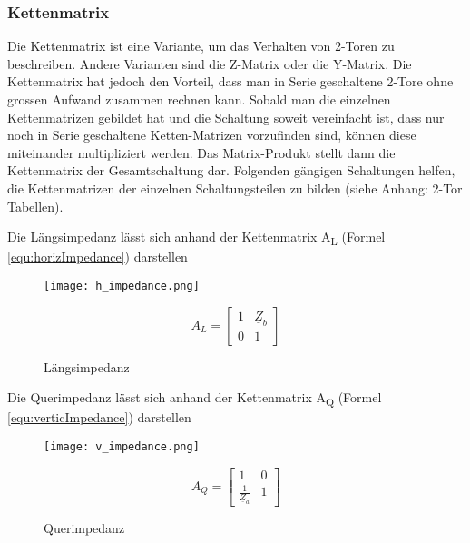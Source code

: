 \subsubsection{Kettenmatrix}\label{subsubsec:kettenmatrix}

Die Kettenmatrix ist eine Variante, um das Verhalten von 2-Toren zu beschreiben. Andere Varianten sind die Z-Matrix oder die Y-Matrix. Die Kettenmatrix hat jedoch den Vorteil, dass man in Serie geschaltene 2-Tore ohne grossen Aufwand zusammen rechnen kann. Sobald man die einzelnen Kettenmatrizen gebildet hat und die Schaltung soweit vereinfacht ist, dass nur noch in Serie geschaltene Ketten-Matrizen vorzufinden sind, können diese miteinander multipliziert werden. Das Matrix-Produkt stellt dann die Kettenmatrix der Gesamtschaltung dar. Folgenden gängigen Schaltungen helfen, die Kettenmatrizen der einzelnen Schaltungsteilen zu bilden (siehe Anhang: 2-Tor Tabellen).

Die Längsimpedanz lässt sich anhand der Kettenmatrix A\textsubscript{L} (Formel \ref{equ:horizImpedance}) darstellen
\begin{figure}[H]
	\begin{minipage}[h]{0.45\linewidth}
		\centering
		\texttt{[image: h\_impedance.png]}
		\caption{Längsimpedanz}
	\end{minipage}
	\begin{minipage}[h]{0.45\linewidth}
		\centering
		\begin{equation}\label{equ:horizImpedance}
			A_L = \left[\begin{matrix}
			1&\underline{Z}_b\\0&1
			\end{matrix}\right]
		\end{equation}
	\end{minipage}
\end{figure}

Die Querimpedanz lässt sich anhand der Kettenmatrix A\textsubscript{Q} (Formel \ref{equ:verticImpedance}) darstellen

\begin{figure}[H]
	\begin{minipage}[h]{0.45\linewidth}
		\centering
		\texttt{[image: v\_impedance.png]}
		\caption{Querimpedanz}
	\end{minipage}
	\begin{minipage}[h]{0.45\linewidth}
		\centering
		\begin{equation}\label{equ:verticImpedance}
			A_Q = \left[\begin{matrix}
			1&0\\\frac{1}{\underline{Z}_a}&1
			\end{matrix}\right]
		\end{equation}
	\end{minipage}
\end{figure}

